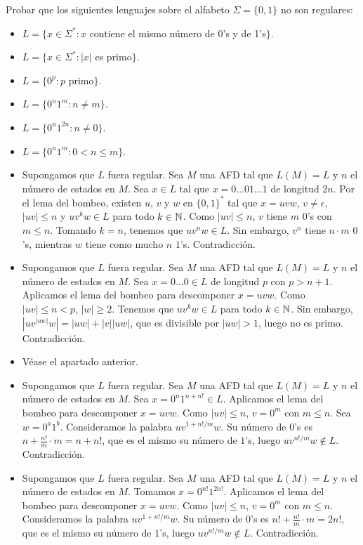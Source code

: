 \documentclass[twoside]{article}
\begin{document}
\begin{ejercicio}{17}
Probar que los siguientes lenguajes sobre el alfabeto $Σ = \{0, 1\}$ no son regulares:
\begin{itemize}
\item $L = \{x ∈ Σ^*
: x$ contiene el mismo número de 0’s y de 1’s$\}$.

\item $L = \{x ∈ Σ^*
: |x|$ es primo$\}$.
\item $L = \{0^p
: p$ primo$\}$.
\item $L = \{0^n1^m : n \neq m\}$.
\item $L = \{0^n1^{2n}
: n \neq 0\}$.
\item $L = \{0^n1^m : 0 < n ≤ m\}$.
\end{itemize}
\end{ejercicio}
\begin{solucion}\mbox{}
\begin{itemize}
	\item Supongamos que $L$ fuera regular. Sea $M$ una AFD tal que $L(M)=L$ y $n$ el número de estados en $M$. Sea $x \in L$ tal que $x=0\dots01\dots1$ de longitud $2n$. Por el lema del bombeo, existen $u$, $v$ y $w$ en $\{0,1\}^*$ tal que $x=uvw$, $v \neq ϵ$, $|uv|≤n$ y $uv^kw \in L$ para todo $k \in \mathbb{N}$. Como $|uv|≤n$, $v$ tiene $m$ $0$'s con $m ≤ n$. Tomando $k=n$, tenemos que $uv^nw \in L$. Sin embargo, $v^n$ tiene $n\cdot m$ $0$'s, mientras $w$ tiene como mucho $n$ $1$'s. Contradicción.
	\item Supongamos que $L$ fuera regular. Sea $M$ una AFD tal que $L(M)=L$ y $n$ el número de estados en $M$. Sea $x=0\dots0\in L$ de longitud $p$ con $p > n+1$. Aplicamos el lema del bombeo para descomponer $x=uvw$. Como $|uv| ≤ n < p$, $|w|≥2$. Tenemos que $uv^kw \in L$ para todo $k \in \mathbb{N}$. Sin embargo, $|uv^{|uw|}w|=|uw|+|v||uw|$, que es divisible por $|uw|>1$, luego no es primo. Contradicción.
	\item Véase el apartado anterior.
	\item Supongamos que $L$ fuera regular. Sea $M$ una AFD tal que $L(M)=L$ y $n$ el número de estados en $M$. Sea $x=0^n1^{n+n!}\in L$. Aplicamos el lema del bombeo para descomponer $x=uvw$. Como $|uv|≤n$, $v=0^m$ con $m≤n$. Sea $w=0^a1^b$. Consideramos la palabra $uv^{1+n!/m}w$. Su número de $0$'s es $n+\frac{n!}{m}\cdot m=n+n!$, que es el mismo su número de $1$'s, luego $uv^{n!/m}w \notin L$. Contradicción.
	\item Supongamos que $L$ fuera regular. Sea $M$ una AFD tal que $L(M)=L$ y $n$ el número de estados en $M$. Tomamos $x=0^{n!}1^{2n!}$. Aplicamos el lema del bombeo para descomponer $x=uvw$. Como $|uv|≤n$, $v=0^m$ con $m≤n$. Consideramos la palabra $uv^{1+n!/m}w$. Su número de $0$'s es $n!+\frac{n!}{m}\cdot m=2n!$, que es el mismo su número de $1$'s, luego $uv^{n!/m}w \notin L$. Contradicción.

\end{itemize}
\end{solucion}
\end{document}
